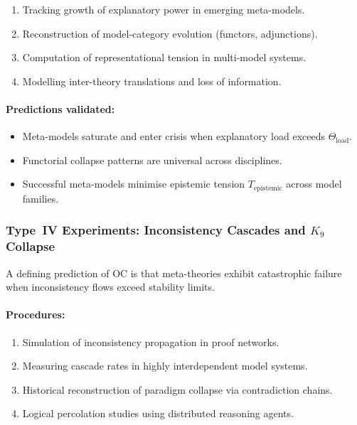 \begin{enumerate}
    \item Tracking growth of explanatory power in emerging meta-models.
    \item Reconstruction of model-category evolution (functors, adjunctions).
    \item Computation of representational tension in multi-model systems.
    \item Modelling inter-theory translations and loss of information.
\end{enumerate}

\paragraph{Predictions validated:}

\begin{itemize}
    \item Meta-models saturate and enter crisis when 
          explanatory load exceeds $\Theta_{\mathrm{load}}$.
    \item Functorial collapse patterns are universal across disciplines.
    \item Successful meta-models minimise epistemic tension 
          $T_{\mathrm{epistemic}}$ across model families.
\end{itemize}



\subsubsection{Type~IV Experiments: Inconsistency Cascades and \texorpdfstring{$K_9$}{K_9} Collapse}

A defining prediction of OC is that meta-theories exhibit 
catastrophic failure when inconsistency flows exceed stability limits.

\paragraph{Procedures:}

\begin{enumerate}
    \item Simulation of inconsistency propagation in proof networks.
    \item Measuring cascade rates in highly interdependent model systems.
    \item Historical reconstruction of paradigm collapse via contradiction chains.
    \item Logical percolation studies using distributed reasoning agents.
\end{enumerate}

